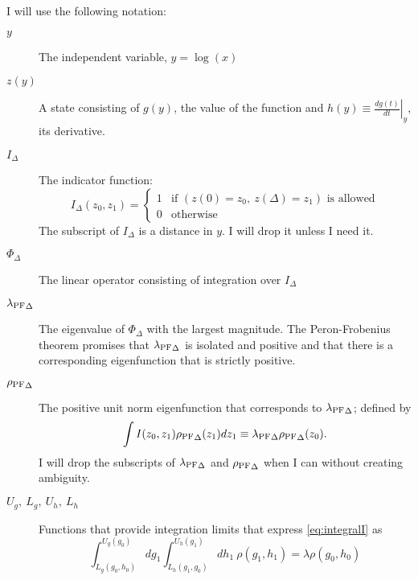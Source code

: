 \documentclass[twocolumn]{article}
\newcommand\lambdaPF{\lambda_{\rm{PF}}} %
\newcommand\rhoPF{\rho_{\rm{PF}}} %
\begin{document}
I will use the following notation:
\begin{description}
\item[$y$] The independent variable, $y = \log(x)$
\item[$z(y)$] A state consisting of $g(y)$, the value of the function
  and $h(y) \equiv \left. \frac{d g(t)}{d t} \right|_y$, its derivative.
\item[$I_\Delta$] The indicator function:
  \begin{equation}
    \label{eq:indicator}
    I_\Delta(z_0, z_1) =
    \begin{cases}
      1 & \text{if } \left( z(0) = z_0,~z(\Delta)=z_1
      \right) \text{ is allowed} \\
      0 & \text{otherwise}
    \end{cases}
  \end{equation}
  The subscript of $I_\Delta$ is a distance in $y$.  I will drop it
  unless I need it.
\item[$\Phi_\Delta$] The linear operator consisting of integration
  over $I_\Delta$
\item[${\lambdaPF}_\Delta$] The eigenvalue of $\Phi_\Delta$ with the largest
  magnitude.  The Peron-Frobenius theorem promises that
  ${\lambdaPF}_\Delta$ is isolated and positive and that there is a
  corresponding eigenfunction that is strictly positive.
\item[${\rhoPF}_\Delta$] The positive unit norm eigenfunction that
  corresponds to ${\lambdaPF}_\Delta$; defined by
  \begin{equation}
    \label{eq:integralI}
    \int I(z_0, z_1) {\rhoPF}_\Delta(z_1) d z_1 \equiv {\lambdaPF}_\Delta
    {\rhoPF}_\Delta(z_0).
  \end{equation}
  I will drop the subscripts of ${\lambdaPF}_\Delta$ and
  ${\rhoPF}_\Delta$ when I can without creating ambiguity.
\item[$U_g,~L_g,~U_h,~L_h$] Functions that provide integration limits
  that express \eqref{eq:integralI} as
  \begin{equation}
    \label{eq:integralUL_}
    \int_{L_g(g_0,h_0)}^{U_g(g_0)} dg_1
    \int_{L_h(g_1,g_0)}^{U_h(g_1)} dh_1~ \rho(g_1, h_1) = \lambda
    \rho(g_0, h_0)
  \end{equation}
\end{description}
\end{document}
